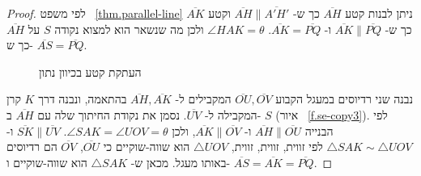 \begin{proof}
לפי משפט%
~\ref{thm.parallel-line}
ניתן לבנות קטע 
$\overline{AH}$
כך ש-
$\overline{AH}\|\overline{A'H'}$
וקטע 
$\overline{AK}$
כך ש-%
$\overline{AK}\|\overline{PQ}$
ו-%
$\overline{AK}=\overline{PQ}$.
$\angle HAK=\theta$
ולכן מה שנשאר הוא למצוא נקודה
$S$
על
$\overline{AH}$
כך ש-%
$\overline{AS}=\overline{PQ}$.
\begin{figure}[tb]
\begin{center}
\end{center}
\caption{העתקת קטע בכיוון נתון}\label{f.se-copy1}
\end{figure}
נבנה שני רדיוסים במעגל הקבוע 
$\overline{OU},\overline{OV}$
המקבילים ל-%
$\overline{AH},\overline{AK}$
בהתאמה, ונבנה דרך
$K$
קרן המקבילה ל-%
$\overline{UV}$.
נסמן את נקודת החיתוך שלה עם
$\overline{AH}$
ב-%
$S$
(איור%
~\ref{f.se-copy3}).
לפי הבנייה
$\overline{AH}\|\overline{OU}$
ו-%
$\overline{AK}\|\overline{OV}$,
ולכן
$\angle SAK=\angle UOV=\theta$.
$\overline{SK}\|\overline{UV}$
ו-%
$\triangle SAK\sim \triangle UOV$
לפי זווית, זווית, זווית,
$\triangle UOV$
הוא שווה-שוקיים כי
$\overline{OU}$, $\overline{OV}$
הם רדיוסים באותו מעגל. מכאן ש-%
$\triangle SAK$
הוא שווה-שוקיים ו-%
$\overline{AS}=\overline{AK}=\overline{PQ}$.
\end{proof}

